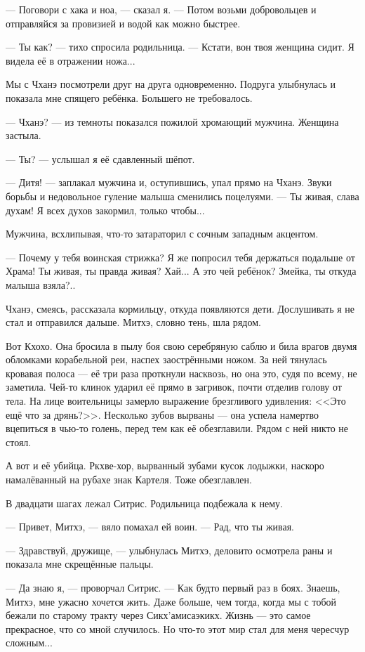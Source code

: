 --- Поговори с хака и ноа, --- сказал я.
--- Потом возьми добровольцев и отправляйся за провизией и водой как можно быстрее.

--- Ты как? --- тихо спросила родильница.
--- Кстати, вон твоя женщина сидит.
Я видела её в отражении ножа...

Мы с Чханэ посмотрели друг на друга одновременно.
Подруга улыбнулась и показала мне спящего ребёнка.
Большего не требовалось.

--- Чханэ? --- из темноты показался пожилой хромающий мужчина.
Женщина застыла.

--- Ты? --- услышал я её сдавленный шёпот.

--- Дитя! --- заплакал мужчина и, оступившись, упал прямо на Чханэ.
Звуки борьбы и недовольное гуление малыша сменились поцелуями.
--- Ты живая, слава духам!
Я всех духов закормил, только чтобы...

Мужчина, всхлипывая, что-то затараторил с сочным западным акцентом.

--- Почему у тебя воинская стрижка?
Я же попросил тебя держаться подальше от Храма!
Ты живая, ты правда живая?
Хай...
А это чей ребёнок?
Змейка, ты откуда малыша взяла?..

Чханэ, смеясь, рассказала кормильцу, откуда появляются дети.
Дослушивать я не стал и отправился дальше.
Митхэ, словно тень, шла рядом.

Вот Кхохо.
Она бросила в пылу боя свою серебряную саблю и била врагов двумя обломками корабельной реи, наспех заострёнными ножом.
За ней тянулась кровавая полоса --- её три раза проткнули насквозь, но она это, судя по всему, не заметила.
Чей-то клинок ударил её прямо в загривок, почти отделив голову от тела.
На лице воительницы замерло выражение брезгливого удивления: <<Это ещё что за дрянь?>>.
Несколько зубов вырваны --- она успела намертво вцепиться в чью-то голень, перед тем как её обезглавили.
Рядом с ней никто не стоял.

А вот и её убийца.
Ркхве-хор, вырванный зубами кусок лодыжки, наскоро намалёванный на рубахе знак Картеля.
Тоже обезглавлен.

В двадцати шагах лежал Ситрис.
Родильница подбежала к нему.

--- Привет, Митхэ, --- вяло помахал ей воин.
--- Рад, что ты живая.

--- Здравствуй, дружище, --- улыбнулась Митхэ, деловито осмотрела раны и показала мне скрещённые пальцы.

--- Да знаю я, --- проворчал Ситрис.
--- Как будто первый раз в боях.
Знаешь, Митхэ, мне ужасно хочется жить.
Даже больше, чем тогда, когда мы с тобой бежали по старому тракту через Сикх'амисаэкикх.
Жизнь --- это самое прекрасное, что со мной случилось.
Но что-то этот мир стал для меня чересчур сложным...

